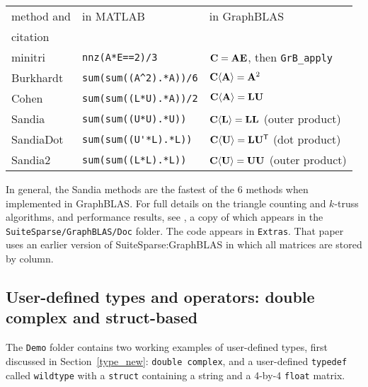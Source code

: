 \documentclass[12pt]{article}
\begin{document}
\vspace{0.05in}
\noindent
{\footnotesize
\begin{tabular}{lll}
\hline
method and     & in MATLAB & in GraphBLAS \\
citation    & & \\
\hline
minitri \cite{WolfBerryStark15} & \verb"nnz(A*E==2)/3"
    & ${\bf C}={\bf AE}$, then \verb'GrB_apply' \\
Burkhardt \cite{Burkhardt16} & \verb"sum(sum((A^2).*A))/6"
    & ${\bf C \langle A \rangle} = {\bf A}^2$ \\
Cohen \cite{AzadBulucGilbert15,Cohen09} & \verb"sum(sum((L*U).*A))/2"
    & ${\bf C \langle A \rangle} = {\bf LU}$ \\
Sandia \cite{WolfDeveciBerryHammondRajamanickam17} & \verb"sum(sum((U*U).*U))"
    & ${\bf C \langle L \rangle} = {\bf LL}$ (outer product) \\
SandiaDot & \verb"sum(sum((U'*L).*L))"
    & ${\bf C \langle U \rangle} = {\bf L}{\bf U}^{\sf T}$ (dot product) \\
Sandia2  & \verb"sum(sum((L*L).*L))"
    & ${\bf C \langle U \rangle} = {\bf UU}$ (outer product) \\
\hline
\end{tabular}
}
\vspace{0.05in}

In general, the Sandia methods are the fastest of the 6 methods when
implemented in GraphBLAS.  For full details on the triangle counting and
$k$-truss algorithms, and performance results, see \cite{Davis18b}, a copy of
which appears in the \verb'SuiteSparse/GraphBLAS/Doc' folder.  The code appears
in \verb'Extras'.  That paper uses an earlier version of SuiteSparse:GraphBLAS
in which all matrices are stored by column.

\newpage
\subsection{User-defined types and operators: double complex and struct-based}
\label{user}

The \verb'Demo' folder contains two working examples of user-defined types,
first discussed in Section~\ref{type_new}: \verb'double complex', and a
user-defined \verb'typedef' called \verb'wildtype' with a \verb'struct'
containing a string and a 4-by-4 \verb'float' matrix.
\end{document}
